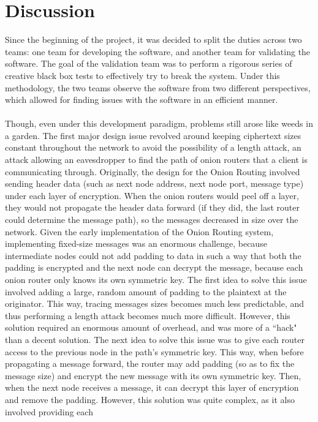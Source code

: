\documentclass[10pt]{report}
\begin{document}
\chapter{Discussion}
\label{discussion}
Since the beginning of the project, it was decided to split the duties across two teams: one team
for developing the software, and another team for validating the software. The goal of the
validation team was to perform a rigorous series of creative black box tests to effectively try to
break the system. Under this methodology, the two teams observe the software from two different
perspectives, which allowed for finding issues with the software in an efficient manner.\\\\
Though, even under this development paradigm, problems still arose like weeds in a garden. The first
major design issue revolved around keeping ciphertext sizes constant throughout the network to avoid
the possibility of a length attack, an attack allowing an eavesdropper to find the path of onion
routers that a client is communicating through. Originally, the design for the Onion Routing
involved sending header data (such as next node address, next node port, message type) under each
layer of encryption. When the onion routers would peel off a layer, they would not propagate the
header data forward (if they did, the last router could determine the message path), so the messages
decreased in size over the network. Given the early implementation of the Onion Routing
system, implementing fixed-size messages was an enormous challenge, because intermediate nodes could
not add padding to
data in such a way that both the padding is encrypted and the next node can decrypt the message,
because each onion router only knows its own symmetric key. The first idea to solve this issue
involved adding a large, random amount of padding to the plaintext at the originator. This way,
tracing messages sizes becomes much less predictable, and thus performing a length attack becomes
much more difficult. However, this solution required an enormous amount of overhead, and was more of
a ``hack" than a decent solution. The next idea to solve this issue was to give each router access to
the previous node in the path's symmetric key. This way, when before propagating a message forward,
the router may add padding (so as to fix the message size) and encrypt the new message with its own
symmetric key. Then, when the next node receives a message, it can decrypt this layer of encryption
and remove the padding. However, this solution was quite complex, as it also involved providing each
\end{document}

